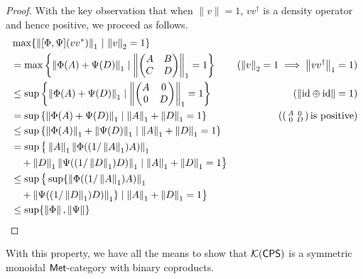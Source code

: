 \begin{proof}
  With the key observation that when \(\|v\| = 1\), \(vv^\dagger\) is a density operator \cite[Eq.~2.12]{watrous2018theory} and hence positive, we proceed as follows.
\begin{equation*}
\begin{split}
         &\max \{ \left\lVert [\Phi,\Psi] (vv^*) \right\rVert_{1} \, | \, \left\lVert v \right\rVert_{2}=1\} \\
        & =
        \max \left \{ \left\lVert \Phi(A) + \Psi(D) \right\rVert_1 \mid 
                \left \lVert
                      \begin{pmatrix}
                              A & B
                              \\
                              C & D
                      \end{pmatrix}
                \right \rVert_1 = 1 
        \right \} & (\left\lVert v \right\rVert_{2}=1 \implies \left\lVert vv^\dag \right\rVert_{1}=1 )
        \\
        & \leq
        \sup \left \{ \left\lVert \Phi(A) + \Psi(D) \right\rVert_1 \mid 
                \left \lVert
                      \begin{pmatrix}
                              A & 0
                              \\
                              0 & D
                      \end{pmatrix}
                \right \rVert_1 = 1 
        \right \}
        & ( \text{$\left\lVert \mathrm{id} \oplus \mathrm{id} \right\rVert = 1$} )
        \\
        & =
        \sup \left \{ \left\lVert \Phi(A) + \Psi(D) \right\rVert_1 \mid 
                \left\lVert A \right\rVert_1 + \left\lVert D \right\rVert_1 = 1
        \right \}
        &  
         \left(\left(\begin{smallmatrix}
    A & 0 \\
    0 & D
  \end{smallmatrix}\right) \text{is positive} \right)
        \\
        & \leq
        \sup \left \{ \left\lVert \Phi(A) \right\rVert_1 + \left\lVert \Psi(D) \right\rVert_1 \mid 
                \left\lVert A \right\rVert_1 + \left\lVert D \right\rVert_1 = 1
        \right \}
        & 
        \\
        & =
        \sup \big \{ \left\lVert A \right\rVert_1\left\lVert \Phi((1/ \left\lVert A \right\rVert_1) A) \right\rVert_1 \\
        & \hspace{10pt}+ 
                \left\lVert D \right\rVert_1\left\lVert \Psi((1 / \left\lVert D \right\rVert_1)D) \right\rVert_1 \mid 
                \left\lVert A \right\rVert_1 + \left\lVert D \right\rVert_1 = 1
        \big \}
        & 
        \\
        & \leq
        \sup \big \{ \sup \{ \left\lVert \Phi((1/ \left\lVert A \right\rVert_1) A) \right\rVert_1 \\
        & \hspace{10pt} + 
                \left\lVert \Psi((1 / \left\lVert D \right\rVert_1)D) \right\rVert_1 \} \mid 
                \left\lVert A \right\rVert_1 + \left\lVert D \right\rVert_1 = 1
        \big \}
        & 
        \\
        &
        \leq \sup \{ \left\lVert \Phi \right\rVert,\left\lVert \Psi \right\rVert \} 
\end{split}
\end{equation*}
\end{proof}
With this property, we have all the means to show that $\mathcal{K}{(\mathsf{CPS})}$ is a symmetric monoidal $\mathsf{Met}$-category with binary coproducts.

